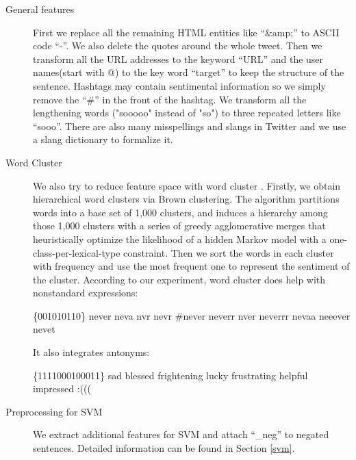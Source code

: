 \begin{description}
\item[General features] First we replace all the remaining HTML entities like ``\&amp;'' to ASCII code ``-''. We also delete the quotes around the whole tweet. Then we transform all the URL addresses to the keyword ``URL'' and the user names(start with @) to the key word ``target'' to keep the structure of the sentence. Hashtags may contain sentimental information so we simply remove the ``\#'' in the front of the hashtag. We transform all the lengthening words ("sooooo" instead of "so") to three repeated letters like ``sooo''. There are also many misspellings and slangs in Twitter and we use a slang dictionary to formalize it.

\item[Word Cluster] We also try to reduce feature space with word cluster \cite{Owoputi:2013}. Firstly, we obtain hierarchical word clusters via Brown clustering. The algorithm partitions words into a base set of 1,000 clusters, and induces a hierarchy among those 1,000 clusters with a series of greedy agglomerative merges that heuristically optimize the likelihood of a hidden Markov model with a one-class-per-lexical-type constraint. Then we sort the words in each cluster with frequency and use the most frequent one to represent the sentiment of the cluster. According to our experiment, word cluster does help with nonstandard expressions: 
\vspace{-5mm}
\begin{mdframed}[
  ]
\{001010110\} never neva nvr nevr \#never neverr nver neverrr nevaa neeever nevet
\end{mdframed}
It also integrates antonyms:
\begin{mdframed}[
  ]
\{1111000100011\} sad blessed frightening lucky frustrating helpful impressed :((( 
\end{mdframed}




\item[Preprocessing for SVM] We extract additional features for SVM and attach ``\_neg'' to negated sentences. Detailed information can be found in Section \ref{svm}.  %


\end{description}
